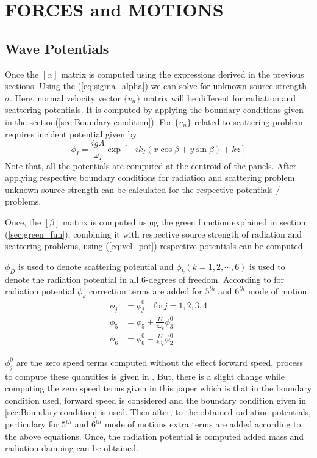 \chapter{FORCES and MOTIONS}
\section{Wave Potentials}
Once the $[\alpha]$ matrix is computed using the expressions derived in the previous sections. Using
the (\ref{eq:sigma_alpha}) we can solve for unknown source strength $\sigma$. Here, normal velocity
vector $\{v_n\}$ matrix will be different for radiation and scattering potentials. It is computed by applying 
the boundary conditions given in the section(\ref{sec:Boundary condition}). For $\{v_n\}$ related to
scattering problem requires incident potential given by 
\begin{equation}
    \label{eq:incident_pot}
    \phi_I = \frac{igA}{\omega_I} \exp[-ik_I(x\cos \beta + y\sin \beta)+kz]
\end{equation}
Note that, all the potentials are computed at the centroid of the panels. After applying respective 
boundary conditions for radiation and scattering problem unknown source strength can be calculated for the 
respective potentials / problems.

Once, the $[\beta]$ matrix is computed using the green function explained in section (\ref{sec:green_fun}), 
combining it with respective source strength of radiation and scattering problems, using 
(\ref{eq:vel_pot}) respective potentials can be computed.

$\phi_D$ is used to denote scattering potential and $\phi_k (k=1, 2, \cdots, 6)$ is used to denote the 
radiation potential in all 6-degrees of freedom. According to \cite{salvesen1970ship} for radiation potential $\phi_k$ 
correction terms are added for $5^{th}$ and $6^{th}$ mode of motion.
\begin{align}
    \phi_j &= \phi^0_j \quad \text{for} j = 1, 2, 3, 4 \\ \nonumber 
    \phi_5 &= \phi_5 +\frac{U}{i\omega_e} \phi^0_3 \\ \nonumber 
    \phi_6 &= \phi^0_6 - \frac{U}{i\omega_e} \phi^0_2
\end{align}

$\phi^0_j$ are the zero speed terms computed without the effect forward speed, process to 
compute these quantities is given in \cite{guha2012development}. But, there is a slight change while
computing the zero speed terms given in this paper which is that in the boundary condition used,
forward speed is considered and the boundary condition given in \ref{sec:Boundary condition} is used.
Then after, to the obtained radiation potentials, perticulary for $5^{th}$ and $6^{th}$ mode of motions 
extra terms are added according to the above equations. Once, the radiation potential is computed 
added mass and radiation damping can be obtained.
